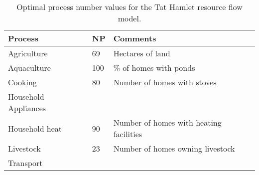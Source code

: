 \begin{table}[h]
	\centering
	\caption{Optimal process number values for the Tat Hamlet resource flow model.} \label{tab:tat_basic_NP_results}
	\begin{tabular}{lll}
		\toprule
		Process  & NP & Comments \\
		\midrule
		Agriculture & 69 & Hectares of land \\
		Aquaculture & 100 & \% of homes with ponds \\
		Cooking & 80 & Number of homes with stoves \\
		Household Appliances &  & \\
		Household heat & 90 & Number of homes with heating facilities \\
		Livestock & 23 & Number of homes owning livestock \\
		Transport &  & \\
		\bottomrule
	\end{tabular}
\end{table}

